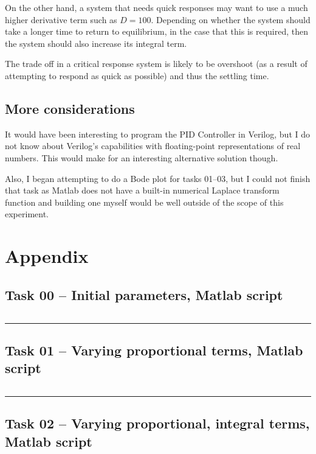 \documentclass[12pt]{article}
\def\hr{{\par\noindent\rule{\textwidth}{0.4pt}}}
\begin{document}
On the other hand, a system that needs quick responses may want to use a much higher derivative term such as $D=100$. Depending on whether the system should take a longer time to return to equilibrium, in the case that this is required, then the system should also increase its integral term.

The trade off in a critical response system is likely to be overshoot (as a result of attempting to respond as quick as possible) and thus the settling time.

\subsection{More considerations}

It would have been interesting to program the PID Controller in Verilog,
but I do not know about Verilog's capabilities with floating-point representations of real numbers.
This would make for an interesting alternative solution though.

Also, I began attempting to do a Bode plot for tasks 01--03,
but I could not finish that task
as Matlab does not have a built-in numerical Laplace transform function
and building one myself would be well outside of the scope of this experiment.

\newpage
\printbibliography

\newpage
\appendix
\section{Appendix}\label{app}

\subsection{Task 00 -- Initial parameters, Matlab script}\label{sap:initial params}
\inputminted{matlab}{src/lab09_task00_initial_dc_motor_motor_params.m}

\hr{}

\subsection{Task 01 -- Varying proportional terms, Matlab script}\label{sap:vary p}
\inputminted{matlab}{src/lab09_task01_vary_p.m}

\hr{}

\subsection{Task 02 -- Varying proportional, integral terms, Matlab script}\label{sap:vary pi}
\inputminted{matlab}{src/lab09_task02_vary_i.m}
\end{document}
